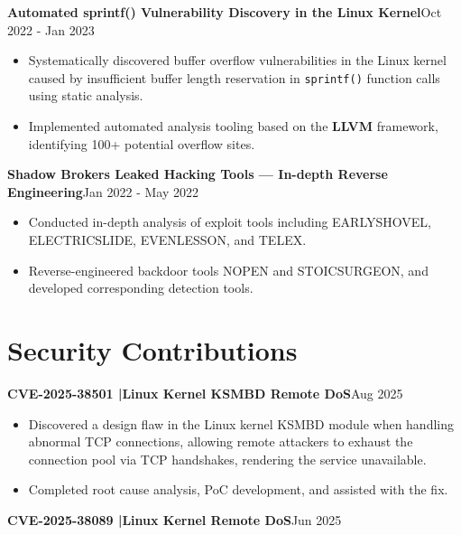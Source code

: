 \documentclass[11pt, a4paper]{article}
\newcommand{\resumeentry}[2]{%
  \noindent\textbf{#1}\hfill{#2}\par
}
\begin{document}
\vspace{6pt}

\resumeentry{Automated sprintf() Vulnerability Discovery in the Linux Kernel}{Oct 2022 - Jan 2023}

\begin{itemize}
  \item Systematically discovered buffer overflow vulnerabilities in the Linux kernel caused by insufficient buffer length reservation in \texttt{sprintf()} function calls using static analysis.
  \item Implemented automated analysis tooling based on the \textbf{LLVM} framework, identifying 100+ potential overflow sites.
\end{itemize}

\vspace{6pt}

\resumeentry{Shadow Brokers Leaked Hacking Tools --- In-depth Reverse Engineering}{Jan 2022 - May 2022}

\begin{itemize}
  \item Conducted in-depth analysis of exploit tools including EARLYSHOVEL, ELECTRICSLIDE, EVENLESSON, and TELEX.
  \item Reverse-engineered backdoor tools NOPEN and STOICSURGEON, and developed corresponding detection tools.
\end{itemize}

\section{Security Contributions}

\resumeentry{CVE-2025-38501 \enspace|\enspace Linux Kernel KSMBD Remote DoS}{Aug 2025}

\begin{itemize}
  \item Discovered a design flaw in the Linux kernel KSMBD module when handling abnormal TCP connections, allowing remote attackers to exhaust the connection pool via TCP handshakes, rendering the service unavailable.
  \item Completed root cause analysis, PoC development, and assisted with the fix.
\end{itemize}

\vspace{6pt}

\resumeentry{CVE-2025-38089 \enspace|\enspace Linux Kernel Remote DoS}{Jun 2025}
\end{document}

